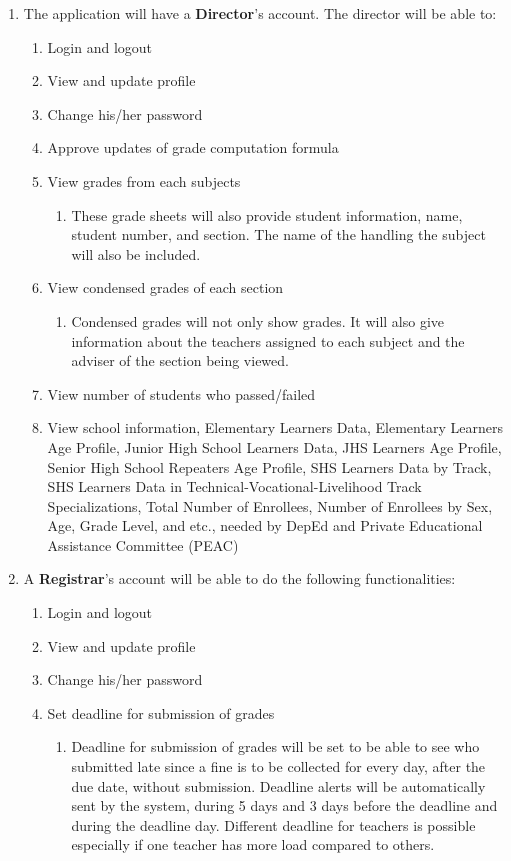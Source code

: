 \documentclass[11pt,a4paper,titlepage]{article}
\begin{document}
\begin{enumerate}
	\item The application will have a \textbf{Director}'s account. The director will be able to:
	\begin{enumerate}
		\item Login and logout
		\item View and update profile
		\item Change his/her password
		\item Approve updates of grade computation formula
		\item View grades from each subjects
        \begin{enumerate}
            \item These grade sheets will also provide student information, name, student number, and section. The name of the handling the subject will also be included.
        \end{enumerate}
        \item View condensed grades of each section
        \begin{enumerate}
            \item Condensed grades will not only show grades. It will also give information about the teachers assigned to each subject and the adviser of the section being viewed.
        \end{enumerate}
        \item View number of students who passed/failed
        \item View school information, Elementary Learners Data, Elementary Learners Age Profile, Junior High School Learners Data, JHS Learners Age Profile, Senior High School Repeaters Age Profile, SHS Learners Data by Track, SHS Learners Data in Technical-Vocational-Livelihood Track Specializations, Total Number of Enrollees, Number of Enrollees by Sex, Age, Grade Level, and etc., needed by DepEd and Private Educational Assistance Committee (PEAC)
    \end{enumerate}
    \item A \textbf{Registrar}'s account will be able to do the following functionalities:
    \begin{enumerate}
        \item Login and logout
        \item View and update profile
        \item Change his/her password
        \item Set deadline for submission of grades
        \begin{enumerate}
            \item Deadline for submission of grades will be set to be able to see who submitted late since a fine is to be collected for every day, after the due date, without submission. Deadline alerts will be automatically sent by the system, during 5 days and 3 days before the deadline and during the deadline day. Different deadline for teachers is possible especially if one teacher has more load compared to others.

\end{enumerate}
\end{enumerate}
\end{enumerate}
\end{document}
